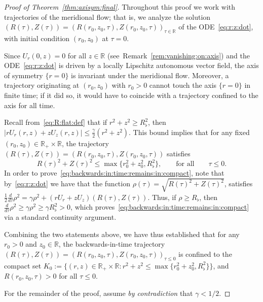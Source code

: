 \documentclass[11pt,reqno]{amsproc}
\numberwithin{equation}{section}
\theoremstyle{remark}
\begin{document}
\begin{proof}[Proof of Theorem~\ref{thm:axisym:final}]
Throughout this proof we work with trajectories of the meridional flow; that is, we analyze the solution $(R(\tau),Z(\tau)) = (R(r_0,z_0,\tau),Z(r_0,z_0,\tau))_{\tau \in \mathbb{R}}$ of the ODE~\eqref{eq:r:z:dot}, with initial condition $(r_0,z_0)$ at $\tau=0$. 

Since $U_r(0,z)=0$ for all $z \in \mathbb{R}$ (see~Remark~\ref{rem:vanishing:on:axis}) and the ODE~\eqref{eq:r:z:dot} is driven by a locally Lipschitz autonomous vector field, the axis of symmetry $\{r=0\}$ is invariant under the meridional flow. Moreover, a trajectory originating at $(r_0,z_0)$ with $r_0>0$ cannot touch the axis $\{r=0\}$ in finite time; if it did so, it would have to coincide with a trajectory confined to the axis for all time.

Recall from~\eqref{eq:R:flat:def} that if $r^2+ z^2 \geq R_\flat^2$, then   $|r U_r(r,z) + z U_z(r,z)| \leq \frac{\gamma}{2} (r^2 + z^2)$. This bound implies that for any fixed $(r_0,z_0) \in \mathbb{R}_+\times \mathbb{R}$, the trajectory $(R(\tau),Z(\tau)) = (R(r_0,z_0,\tau),Z(r_0,z_0,\tau))$ satisfies 
\begin{equation}
\label{eq:backwards:in:time:remains:in:compact}
R(\tau)^2 + Z(\tau)^2 \leq \max\{ r_0^2+ z_0^2 , R_\flat^2\}, 
\qquad
\mbox{for all}
\qquad
\tau \leq 0. 
\end{equation}
In order to prove~\eqref{eq:backwards:in:time:remains:in:compact}, note that by~\eqref{eq:r:z:dot} we have that the function $\rho(\tau)= \sqrt{R(\tau)^2 + Z(\tau)^2}$, satisfies $\frac 12 \frac{d}{d\tau} \rho^2 = \gamma \rho^2 + (r U_r + z U_z)(R(\tau),Z(\tau))$. Thus, if $\rho  \geq  R_\flat$, then $ \frac{d}{d\tau} \rho^2 \geq \gamma \rho^2 \geq \gamma R_\flat^2>0$, which proves~\eqref{eq:backwards:in:time:remains:in:compact} via a standard continuity argument.

Combining the two statements above, we have thus established that for any $r_0>0$ and $z_0 \in \mathbb{R}$, the backwards-in-time trajectory $(R(\tau),Z(\tau))=(R(r_0,z_0,\tau),Z(r_0,z_0,\tau))_{\tau \leq 0}$ is confined  to the compact set $K_0 := \{ (r,z) \in \mathbb{R}_+ \times \mathbb{R} \colon r^2 + z^2 \leq \max\{ r_0^2 + z_0^2, R_\flat^2\} \}$, and $R(r_0,z_0,\tau)>0$ for all $\tau \leq 0$.


For the remainder of the proof, assume \emph{by contradiction} that $\gamma < 1/2$. 


\end{proof}
\end{document}
